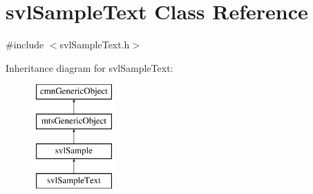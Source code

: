 \hypertarget{classsvl_sample_text}{\section{svl\-Sample\-Text Class Reference}
\label{classsvl_sample_text}
}


{\ttfamily \#include $<$svl\-Sample\-Text.\-h$>$}

Inheritance diagram for svl\-Sample\-Text\-:\begin{figure}[H]
\begin{center}
\leavevmode
\includegraphics[height=4.000000cm]{d7/df9/classsvl_sample_text}
\end{center}
\end{figure}
